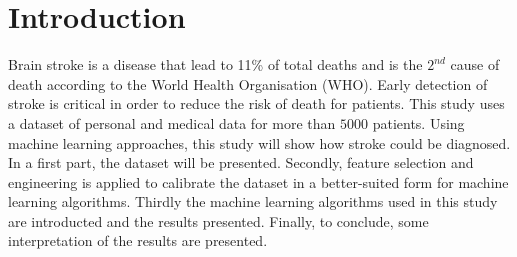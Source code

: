 \section{Introduction}
Brain stroke is a disease that lead to 11\% of total deaths and is the $2^{nd}$ cause of death 
according to the World Health Organisation (WHO). Early detection of stroke is critical in order to 
reduce the risk of death for patients. This study uses a dataset of personal and medical data for 
more than $5000$ patients. Using machine learning approaches, this study will show how stroke could 
be diagnosed.\\

In a first part, the dataset will be presented. Secondly, feature selection and engineering is 
applied to calibrate the dataset in a better-suited form for machine learning algorithms. Thirdly the 
machine learning algorithms used in this study are introducted and the results presented. Finally, to 
conclude, some interpretation of the results are presented.
